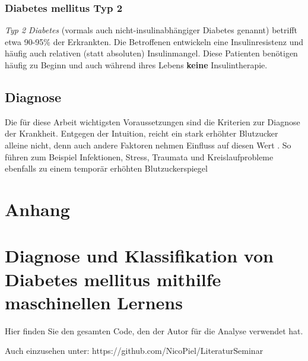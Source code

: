 \documentclass[11.5pt]{article}
\begin{document}
\subsubsection{Diabetes mellitus Typ 2}


\textit{Typ 2 Diabetes} (vormals auch \glqq nicht-insulinabhängiger Diabetes genannt\grqq{}) betrifft etwa 90-95\% der Erkrankten. Die Betroffenen entwickeln eine Insulinresistenz und häufig auch relativen (statt absoluten) Insulinmangel. Diese Patienten benötigen häufig zu Beginn und auch während ihres Lebens \textbf{keine} Insulintherapie. \cite[p.~63]{ada}

\newpage

\subsection{Diagnose}


Die für diese Arbeit wichtigsten Voraussetzungen sind die Kriterien zur Diagnose der Krankheit. Entgegen der Intuition, reicht ein stark erhöhter Blutzucker alleine nicht, denn auch andere Faktoren nehmen Einfluss auf diesen Wert \cite[p.~540]{who}. So führen zum Beispiel Infektionen, Stress, Traumata und Kreislaufprobleme ebenfalls zu einem temporär erhöhten Blutzuckerspiegel \cite[p.~540]{who}


\newpage

\appendix
\section{Anhang}


    
    \hypertarget{diagnose-und-klassifikation-von-diabetes-mellitus-mithilfe-maschinellen-lernens}{%
\section{Diagnose und Klassifikation von Diabetes mellitus mithilfe
maschinellen
Lernens}\label{diagnose-und-klassifikation-von-diabetes-mellitus-mithilfe-maschinellen-lernens}}

Hier finden Sie den gesamten Code, den der Autor für die Analyse
verwendet hat.

Auch einzusehen unter: https://github.com/NicoPiel/LiteraturSeminar
\end{document}
